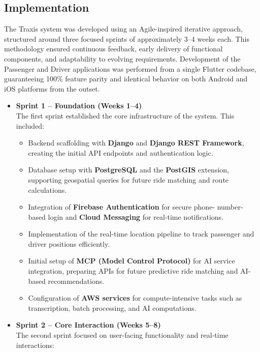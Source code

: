 \subsection{Implementation}

The Traxis system was developed using an Agile-inspired iterative approach,
structured around three focused sprints of approximately 3–4 weeks each. This
methodology ensured continuous feedback, early delivery of functional
components, and adaptability to evolving requirements. Development of the
Passenger and Driver applications was performed from a single Flutter codebase,
guaranteeing 100\% feature parity and identical behavior on both Android and iOS
platforms from the outset.


\begin{itemize}
 \item \textbf{Sprint 1 – Foundation (Weeks 1–4)} \\
The first sprint established the core infrastructure of the system. This
included:

          \begin{itemize}
 \item Backend scaffolding with \textbf{Django} and \textbf{Django REST
        Framework}, creating the initial API endpoints and authentication logic.
 \item Database setup with \textbf{PostgreSQL} and the \textbf{PostGIS}
        extension, supporting geospatial queries for future ride matching and
        route calculations.
 \item Integration of \textbf{Firebase Authentication} for secure phone-
        number-based login and \textbf{Cloud Messaging} for real-time
        notifications.
 \item Implementation of the real-time location pipeline to track
        passenger and driver positions efficiently.
 \item Initial setup of \textbf{MCP (Model Control Protocol)} for AI
        service integration, preparing APIs for future predictive ride matching
        and AI-based recommendations.
 \item Configuration of \textbf{AWS services} for compute-intensive tasks
        such as transcription, batch processing, and AI computations.
          \end{itemize}

 \item \textbf{Sprint 2 – Core Interaction (Weeks 5–8)} \\
The second sprint focused on user-facing functionality and real-time
interactions:


\end{itemize}
